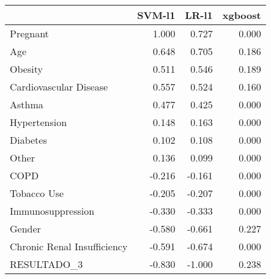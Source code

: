 \begin{tabular}{lrrr}
\toprule
{} &  SVM-l1 &  LR-l1 &  xgboost \\
\midrule
Pregnant                    &   1.000 &  0.727 &    0.000 \\
Age                         &   0.648 &  0.705 &    0.186 \\
Obesity                     &   0.511 &  0.546 &    0.189 \\
Cardiovascular Disease      &   0.557 &  0.524 &    0.160 \\
Asthma                      &   0.477 &  0.425 &    0.000 \\
Hypertension                &   0.148 &  0.163 &    0.000 \\
Diabetes                    &   0.102 &  0.108 &    0.000 \\
Other                       &   0.136 &  0.099 &    0.000 \\
COPD                        &  -0.216 & -0.161 &    0.000 \\
Tobacco Use                 &  -0.205 & -0.207 &    0.000 \\
Immunosuppression           &  -0.330 & -0.333 &    0.000 \\
Gender                      &  -0.580 & -0.661 &    0.227 \\
Chronic Renal Insufficiency &  -0.591 & -0.674 &    0.000 \\
RESULTADO\_3                 &  -0.830 & -1.000 &    0.238 \\
\bottomrule
\end{tabular}
